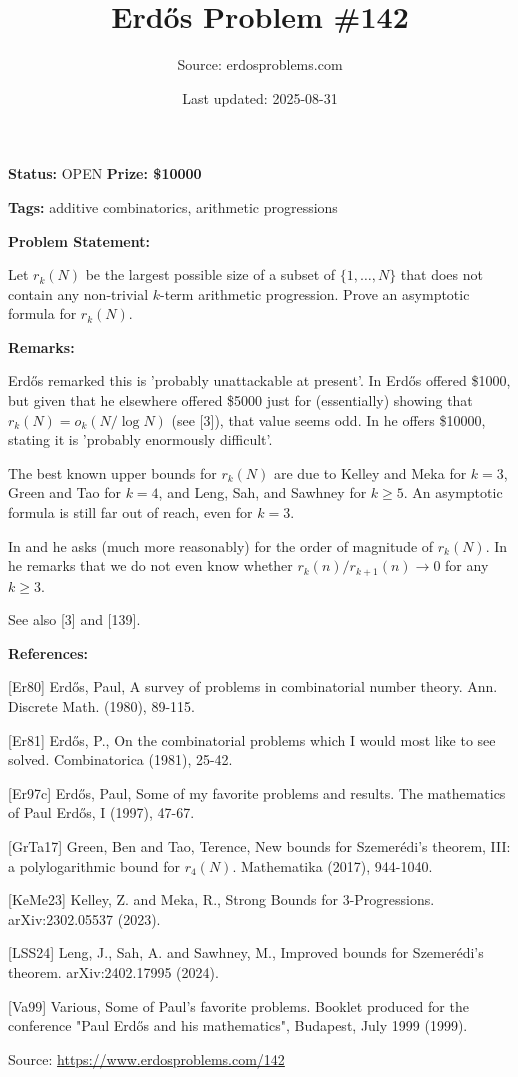 \documentclass{article}
\title{Erd\H{o}s Problem \#142}
\date{Last updated: 2025-08-31}
\author{Source: erdosproblems.com}
\begin{document}
\maketitle

\noindent\textbf{Status:} OPEN \quad \textbf{Prize: \$10000}

\noindent\textbf{Tags:} additive combinatorics, arithmetic progressions

\medskip
\noindent\textbf{Problem Statement:}

Let $r_k(N)$ be the largest possible size of a subset of $\{1,\ldots,N\}$ that does not contain any non-trivial $k$-term arithmetic progression. Prove an asymptotic formula for $r_k(N)$.

\bigskip
\noindent\textbf{Remarks:}

Erd\H{o}s remarked this is 'probably unattackable at present'. In \cite{Er97c} Erd\H{o}s offered \$1000, but given that he elsewhere offered \$5000 just for (essentially) showing that $r_k(N)=o_k(N/\log N)$ (see [3]), that value seems odd. In \cite{Er81} he offers \$10000, stating it is 'probably enormously difficult'.

The best known upper bounds for $r_k(N)$ are due to Kelley and Meka \cite{KeMe23} for $k=3$, Green and Tao \cite{GrTa17} for $k=4$, and Leng, Sah, and Sawhney \cite{LSS24} for $k\geq 5$. An asymptotic formula is still far out of reach, even for $k=3$.

In \cite{Er80} and \cite{Va99} he asks (much more reasonably) for the order of magnitude of $r_k(N)$. In \cite{Er80} he remarks that we do not even know whether $r_k(n)/r_{k+1}(n)\to 0$ for any $k\geq 3$.
 
See also [3] and [139].

\bigskip
\noindent\textbf{References:}

[Er80] Erd\H{o}s, Paul, A survey of problems in combinatorial number theory. Ann. Discrete Math. (1980), 89-115.
 
 [Er81] Erd\H{o}s, P., On the combinatorial problems which I would most like to see solved. Combinatorica (1981), 25-42.
 
 [Er97c] Erd\H{o}s, Paul, Some of my favorite problems and results. The mathematics of Paul Erd\H{o}s, I (1997), 47-67.
 
 [GrTa17] Green, Ben and Tao, Terence, New bounds for Szemer\'{e}di's theorem, III: a polylogarithmic bound for $r_4(N)$. Mathematika (2017), 944-1040.
 
 [KeMe23] Kelley, Z. and Meka, R., Strong Bounds for 3-Progressions. arXiv:2302.05537 (2023).
 
 [LSS24] Leng, J., Sah, A. and Sawhney, M., Improved bounds for Szemer\'{e}di's theorem. arXiv:2402.17995 (2024).
 
 [Va99] Various, Some of Paul's favorite problems. Booklet produced for the conference "Paul Erd\H{o}s and his mathematics", Budapest, July 1999 (1999).

\bigskip
\noindent\small{Source: \url{https://www.erdosproblems.com/142}}
\end{document}
